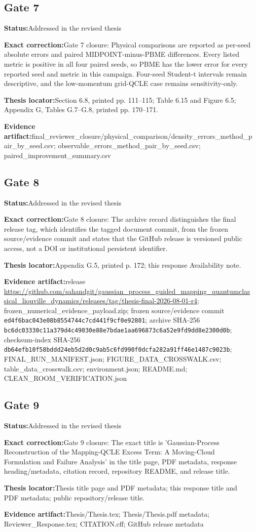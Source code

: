 \documentclass[11pt]{article}
\newcommand{\field}[2]{\textbf{#1}\quad #2\par}
\begin{document}
\subsection*{Gate 7}
\field{Status:}{Addressed in the revised thesis}
\field{Exact correction:}{Gate 7 closure: Physical comparisons are reported as per-seed absolute errors and paired MIDPOINT-minus-PBME differences. Every listed metric is positive in all four paired seeds, so PBME has the lower error for every reported seed and metric in this campaign. Four-seed Student-t intervals remain descriptive, and the low-momentum grid-QCLE case remains sensitivity-only.}
\field{Thesis locator:}{Section 6.8, printed pp. 111--115; Table 6.15 and Figure 6.5; Appendix G, Tables G.7--G.8, printed pp. 170--171.}
\field{Evidence artifact:}{final\_reviewer\_closure/physical\_comparison/density\_errors\_method\_pair\_by\_seed.csv; observable\_errors\_method\_pair\_by\_seed.csv; paired\_improvement\_summary.csv}
\subsection*{Gate 8}
\field{Status:}{Addressed in the revised thesis}
\field{Exact correction:}{Gate 8 closure: The archive record distinguishes the final release tag, which identifies the tagged document commit, from the frozen source/evidence commit and states that the GitHub release is versioned public access, not a DOI or institutional persistent identifier.}
\field{Thesis locator:}{Appendix G.5, printed p. 172; this response Availability note.}
\field{Evidence artifact:}{release \url{https://github.com/sahandgit/gaussian_process_guided_mapping_quantumclassical_liouville_dynamics/releases/tag/thesis-final-2026-08-01-r4}; frozen\_numerical\_evidence\_payload.zip; frozen source/evidence commit \texttt{ed4f6bac\allowbreak{}043e08b8\allowbreak{}554744c7\allowbreak{}cd441f9c\allowbreak{}f0e92801}; archive SHA-256 \texttt{bc6dc033\allowbreak{}30c11a37\allowbreak{}9d4c4903\allowbreak{}0e88e7bd\allowbreak{}ae1aa696\allowbreak{}873c6a52\allowbreak{}e9fd9dd8\allowbreak{}e2300d0b}; checksum-index SHA-256 \texttt{db64efb1\allowbreak{}0f58bddd\allowbreak{}24eb5d2d\allowbreak{}0c9ab5c6\allowbreak{}fd990f0d\allowbreak{}cfa282a9\allowbreak{}1ff46e14\allowbreak{}87c9023b}; FINAL\_RUN\_MANIFEST.json; FIGURE\_DATA\_CROSSWALK.csv; table\_data\_crosswalk.csv; environment.json; README.md; CLEAN\_ROOM\_VERIFICATION.json}
\subsection*{Gate 9}
\field{Status:}{Addressed in the revised thesis}
\field{Exact correction:}{Gate 9 closure: The exact title is 'Gaussian-Process Reconstruction of the Mapping-QCLE Excess Term: A Moving-Cloud Formulation and Failure Analysis' in the title page, PDF metadata, response heading/metadata, citation record, repository README, and release title.}
\field{Thesis locator:}{Thesis title page and PDF metadata; this response title and PDF metadata; public repository/release title.}
\field{Evidence artifact:}{Thesis/Thesis.tex; Thesis/Thesis.pdf metadata; Reviewer\_Response.tex; CITATION.cff; GitHub release metadata}
\end{document}
